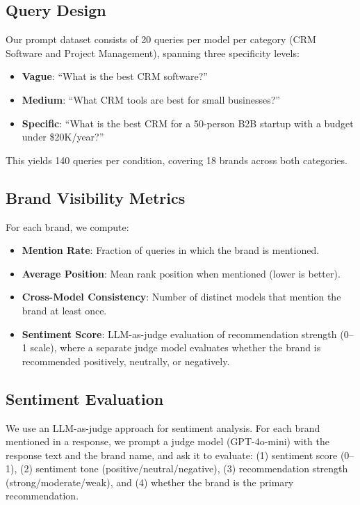 \documentclass{article}
\begin{document}
\subsection{Query Design}

Our prompt dataset consists of 20 queries per model per category (CRM Software and Project Management), spanning three specificity levels:

\begin{itemize}
  \item \textbf{Vague}: ``What is the best CRM software?''
  \item \textbf{Medium}: ``What CRM tools are best for small businesses?''
  \item \textbf{Specific}: ``What is the best CRM for a 50-person B2B startup with a budget under \$20K/year?''
\end{itemize}

This yields 140 queries per condition, covering 18 brands across both categories.

\subsection{Brand Visibility Metrics}

For each brand, we compute:

\begin{itemize}
  \item \textbf{Mention Rate}: Fraction of queries in which the brand is mentioned.
  \item \textbf{Average Position}: Mean rank position when mentioned (lower is better).
  \item \textbf{Cross-Model Consistency}: Number of distinct models that mention the brand at least once.
  \item \textbf{Sentiment Score}: LLM-as-judge evaluation of recommendation strength (0–1 scale), where a separate judge model evaluates whether the brand is recommended positively, neutrally, or negatively.
\end{itemize}

\subsection{Sentiment Evaluation}

We use an LLM-as-judge approach for sentiment analysis. For each brand mentioned in a response, we prompt a judge model (GPT-4o-mini) with the response text and the brand name, and ask it to evaluate: (1) sentiment score (0–1), (2) sentiment tone (positive/neutral/negative), (3) recommendation strength (strong/moderate/weak), and (4) whether the brand is the primary recommendation.
\end{document}
